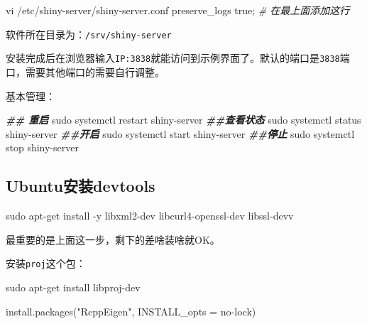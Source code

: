 \documentclass[
  10pt,
]{book}
\newenvironment{Shaded}{\begin{snugshade}}{\end{snugshade}}
\newcommand{\AttributeTok}[1]{\textcolor[rgb]{0.77,0.63,0.00}{#1}}
\newcommand{\CommentTok}[1]{\textcolor[rgb]{0.56,0.35,0.01}{\textit{#1}}}
\newcommand{\DocumentationTok}[1]{\textcolor[rgb]{0.56,0.35,0.01}{\textbf{\textit{#1}}}}
\newcommand{\FunctionTok}[1]{\textcolor[rgb]{0.00,0.00,0.00}{#1}}
\newcommand{\NormalTok}[1]{#1}
\newcommand{\SpecialCharTok}[1]{\textcolor[rgb]{0.00,0.00,0.00}{#1}}
\newcommand{\StringTok}[1]{\textcolor[rgb]{0.31,0.60,0.02}{#1}}
\begin{document}
\begin{Shaded}
\begin{Highlighting}[]
\NormalTok{vi }\SpecialCharTok{/}\NormalTok{etc}\SpecialCharTok{/}\NormalTok{shiny}\SpecialCharTok{{-}}\NormalTok{server}\SpecialCharTok{/}\NormalTok{shiny}\SpecialCharTok{{-}}\NormalTok{server.conf}
\NormalTok{preserve\_logs true; }\CommentTok{\# 在最上面添加这行}
\end{Highlighting}
\end{Shaded}

软件所在目录为：\texttt{/srv/shiny-server}

安装完成后在浏览器输入\texttt{IP:3838}就能访问到示例界面了。默认的端口是\texttt{3838}端口，需要其他端口的需要自行调整。

基本管理：

\begin{Shaded}
\begin{Highlighting}[]
\DocumentationTok{\#\# 重启}
\NormalTok{sudo systemctl restart shiny}\SpecialCharTok{{-}}\NormalTok{server}
\DocumentationTok{\#\#查看状态 }
\NormalTok{sudo systemctl status shiny}\SpecialCharTok{{-}}\NormalTok{server }
\DocumentationTok{\#\#开启 }
\NormalTok{sudo systemctl start shiny}\SpecialCharTok{{-}}\NormalTok{server }
\DocumentationTok{\#\#停止 }
\NormalTok{sudo systemctl stop shiny}\SpecialCharTok{{-}}\NormalTok{server }
\end{Highlighting}
\end{Shaded}

\hypertarget{ubuntuux5b89ux88c5devtools}{%
\subsection{Ubuntu安装devtools}\label{ubuntuux5b89ux88c5devtools}}

\begin{Shaded}
\begin{Highlighting}[]
\NormalTok{sudo apt}\SpecialCharTok{{-}}\NormalTok{get install }\SpecialCharTok{{-}}\NormalTok{y libxml2}\SpecialCharTok{{-}}\NormalTok{dev libcurl4}\SpecialCharTok{{-}}\NormalTok{openssl}\SpecialCharTok{{-}}\NormalTok{dev libssl}\SpecialCharTok{{-}}\NormalTok{devv}
\end{Highlighting}
\end{Shaded}

最重要的是上面这一步，剩下的差啥装啥就OK。

安装\texttt{proj}这个包：

\begin{Shaded}
\begin{Highlighting}[]
\NormalTok{sudo apt}\SpecialCharTok{{-}}\NormalTok{get install libproj}\SpecialCharTok{{-}}\NormalTok{dev}

\FunctionTok{install.packages}\NormalTok{(}\StringTok{"RcppEigen"}\NormalTok{, }\AttributeTok{INSTALL\_opts =} \StringTok{\textquotesingle{}{-}{-}no{-}lock\textquotesingle{}}\NormalTok{)}
\end{Highlighting}
\end{Shaded}
\end{document}
